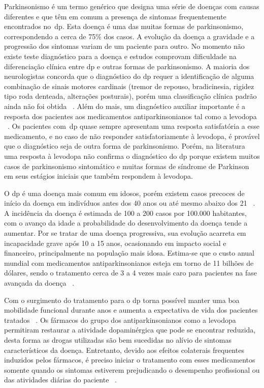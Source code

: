 Parkinsonismo é um termo genérico que designa uma série de doenças com causas diferentes e que têm em comum a presença de sintomas frequentemente encontrados no~\ac{dp}. Esta doença é uma das muitas formas de parkinsonismo, correspondendo a cerca de 75$\%$ dos casos. A evolução da doença a gravidade e a progressão dos sintomas variam de um paciente para outro. No momento não existe teste diagnóstico para a doença e estudos comprovam dificuldade na diferenciação clínica entre \ac{dp} e outras formas de parkinsonismo. A maioria dos neurologistas concorda que o diagnóstico do \ac{dp} requer a identificação de alguma combinação de sinais motores cardinais (tremor de repouso, bradicinesia, rigidez tipo roda denteada, alterações posturais), porém uma classificação clínica padrão ainda não foi obtida ~\cite{protpar010}. Além do mais, um diagnóstico auxiliar importante é a resposta dos pacientes aos medicamentos antiparkinsonianos tal como a levodopa ~\cite{protpar010}. Os pacientes com~\ac{dp} quase 
sempre apresentam uma resposta satisfatória a esse medicamento, e no caso de não responder satisfatoriamente à levodopa, é provável que o diagnóstico seja de outra forma de parkinsonismo. Porém, na literatura ~\cite{rowlandtratado} uma resposta à levodopa não confirma o diagnóstico do \ac{dp} porque existem muitos casos de parkinsonismo sintomático e muitas formas de síndrome de Parkinson em seus estágios iniciais que também respondem à levodopa. 

O \ac{dp} é uma doença mais comum em idosos, porém existem casos precoces de início da doença em indivíduos antes dos 40 anos ou até mesmo abaixo dos 21 ~\cite{menezes2003}. A incidência da doença é estimada de 100 a 200 casos por 100.000 habitantes, com o avanço da idade a probabilidade do desenvolvimento da doença tende a aumentar. Por se tratar de uma doença progressiva, sua evolução acarreta em incapacidade grave após 10 a 15 anos, ocasionando em impacto social e financeiro, principalmente na população mais idosa. Estima-se que o custo anual mundial com medicamentos antiparkinsonianos esteja em torno de 11 bilhões de dólares, sendo o tratamento cerca de 3 a 4 vezes mais caro para pacientes na fase avançada da doença ~\cite{protpar010}.

Com o surgimento do tratamento para o \ac{dp} torna possível manter uma boa mobilidade funcional durante anos e aumenta a expectativa de vida dos pacientes tratados ~\cite{rodrigues2006}. Os fármacos do grupo dos antiparkinsonianos como a levodopa permitiram restaurar a atividade dopaminérgica que pode se encontrar reduzida, desta forma as drogas utilizadas são bem sucedidas no alívio de sintomas característicos da doença. Entretanto, devido aos efeitos colaterais frequentes induzidos pelos fármacos, é preciso iniciar o tratamento com esses medicamentos somente quando os sintomas estiverem prejudicando o desempenho profissional ou das atividades diárias do paciente ~\cite{rodrigues2006}.

